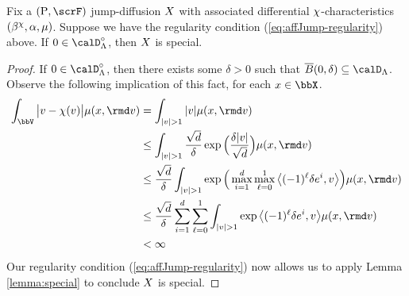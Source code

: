 \begin{proposition}
  \label{proposition:LK-special}
  Fix a $(\Prb, \scrF)$ jump-diffusion $X$ with associated differential $\chi$-characteristics $(\beta^\chi, \alpha, \mu)$.
  Suppose we have the regularity condition (\ref{eq:affJump-regularity}) above.
  If $0 \in \odeSpace^\circ$, then $X$ is special.
\end{proposition}
\begin{proof}
  \label{proof:proposition:LK-special}
  If $0 \in \odeSpace^\circ$, then there exists some $\delta > 0$ such that $\closedBall{0}{\delta} \subseteq \odeSpace$.
  Observe the following implication of this fact, for each $\stateVar \in \stateSpace$.
  \begin{align*}
    \int_{\vecSpace} \big|\markVar - \trunc(\markVar)\big| \affJump(\stateVar, \rmd\markVar)
    &= \int_{|\markVar|>1} |\markVar| \affJump(\stateVar, \rmd\markVar) \\
    &\leq \int_{|\markVar|>1} \frac{\sqrt{d}}{\delta} \exp\Big(\frac{\delta|\markVar|}{\sqrt d} \Big) \affJump(\stateVar, \rmd\markVar) \\
    &\leq \frac{\sqrt d}{\delta} \int_{|\markVar|>1} \exp\Big(\max_{i=1}^d \max_{\ell=0}^1 \bprj{(-1)^\ell \delta \basisVec^i}{\markVar} \Big) \affJump(\stateVar,\rmd\markVar) \\
    &\leq \frac{\sqrt d}{\delta} \sum_{i=1}^d \sum_{\ell=0}^1 \int_{|\markVar|>1} \exp\bprj{(-1)^\ell \delta \basisVec^i}{\markVar} \affJump(\stateVar,\rmd\markVar) \\
    &< \infty
  \end{align*}
  Our regularity condition (\ref{eq:affJump-regularity}) now allows us to apply Lemma \ref{lemma:special} to conclude $X$ is special.
\end{proof}
